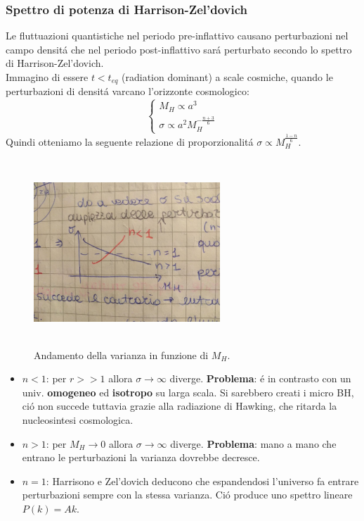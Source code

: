 \documentclass[12pt, a4paper]{article}
\begin{document}
\subsubsection{Spettro di potenza di Harrison-Zel'dovich}
Le fluttuazioni quantistiche nel periodo pre-inflattivo causano perturbazioni nel campo densit\'{a} che nel periodo post-inflattivo sar\'{a} perturbato secondo lo spettro di Harrison-Zel'dovich.\\
Immagino di essere $t<t_{eq}$ (radiation dominant) a scale cosmiche, quando le perturbazioni di densit\'{a} varcano l'orizzonte cosmologico:
\begin{equation}
\begin{cases}
M_H\propto a^3
\\
\sigma\propto a^2 M_H^{-\frac{n+3}{6}} 
\end{cases}
\end{equation}
Quindi otteniamo la seguente relazione di proporzionalit\'{a} $\sigma\propto M_H^{\frac{1-n}{6}} $. 
\begin{figure}[htp]
\centering
\includegraphics[width=7cm, height=7cm]{images/harrisonzeldovich.jpeg}
\caption{Andamento della varianza in funzione di $M_H$.}
\label{fig:harrisonzeldovich}
\end{figure}
\begin{itemize}
\item $n<1$: per $r>>1$ allora $\sigma \rightarrow \infty$ diverge. \textbf{Problema}: \'{e} in contrasto con un univ. \textbf{omogeneo} ed \textbf{isotropo} su larga scala. Si sarebbero creati i micro BH, ci\'{o} non succede tuttavia grazie alla radiazione di Hawking, che ritarda la nucleosintesi cosmologica.
\item $n>1$: per $M_H\rightarrow 0 $ allora $\sigma \rightarrow \infty$ diverge. \textbf{Problema}: mano a mano che entrano le perturbazioni la varianza dovrebbe decresce.
\item $n=1$: Harrisono e Zel'dovich deducono che espandendosi l'universo fa entrare perturbazioni sempre con la stessa varianza. Ci\'{o} produce uno spettro  lineare $P(k)=Ak$. 
\end{itemize}
\end{document}
